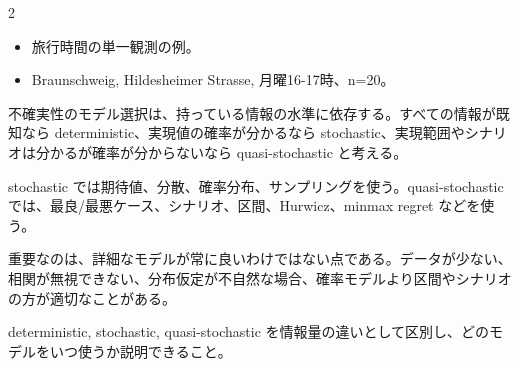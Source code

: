 \clearpage



\vspace{1.5mm}

\begin{multicols}{2}

\footnotesize

\raggedcolumns


\begin{itemize}
\item 旅行時間の単一観測の例。
\item Braunschweig, Hildesheimer Strasse, 月曜16-17時、n=20。
\end{itemize}

不確実性のモデル選択は、持っている情報の水準に依存する。すべての情報が既知なら deterministic、実現値の確率が分かるなら stochastic、実現範囲やシナリオは分かるが確率が分からないなら quasi-stochastic と考える。\par

stochastic では期待値、分散、確率分布、サンプリングを使う。quasi-stochastic では、最良/最悪ケース、シナリオ、区間、Hurwicz、minmax regret などを使う。\par

重要なのは、詳細なモデルが常に良いわけではない点である。データが少ない、相関が無視できない、分布仮定が不自然な場合、確率モデルより区間やシナリオの方が適切なことがある。\par

deterministic, stochastic, quasi-stochastic を情報量の違いとして区別し、どのモデルをいつ使うか説明できること。\par


\end{multicols}
